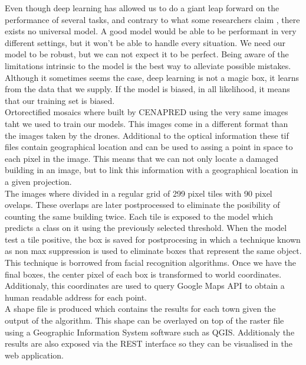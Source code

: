 


Even though deep learning has allowed us to do a giant leap forward on the performance of several tasks, and contrary to what some researchers claim \cite{DBLP:journals/corr/KaiserGSVPJU17}, there exists no universal model. A good model would be able to be performant in very different settings, but it won't be able to handle every situation. We need our model to be robust, but we can not expect it to be perfect. Being aware of the limitations intrinsic to the model is the best way to alleviate possible mistakes. Although it sometimes seems the case, deep learning is not a magic box, it learns from the data that we supply. If the model is biased, in all likelihood, it means that our training set is biased.\\

Ortorectified mosaics where built by CENAPRED using the very same images taht we used to train our models. This images come in a different format than the images taken by the drones. Additional to the optical information these tif files contain geographical location and can be used to assing a point in space to each pixel in the image. This means that we can not only locate a damaged building in an image, but to link this information with a geographical location in a given projection.\\

The images where divided in a regular grid of 299 pixel tiles with 90 pixel ovelaps. These overlaps are later postprocessed to eliminate the posibility of counting the same building twice. Each tile is exposed to the model which predicts a class on it using the previously selected threshold. When the model test a tile positive, the box is saved for postprocesing in which a technique known as non max suppression is used to eliminate boxes that represent the same object. This technique is borrowed from facial recognition algorithms. Once we have the final boxes, the center pixel of each box is transformed to world coordinates. Additionaly, this coordinates are used to query Google Maps API to obtain a human readable address for each point.\\

A shape file is produced which contains the results for each town given the output of the algorithm. This shape can be overlayed on top of the raster file using a Geographic Information System software such as QGIS. Additionaly the results are also exposed via the REST interface so they can be visualised in the web application.\\



